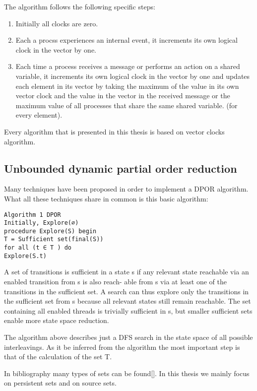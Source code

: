 \documentclass[a4paper,10pt]{article}
\begin{document}
The algorithm follows the following specific steps:

\begin{enumerate}
    \item Initially all clocks are zero.
    \item Each  a procss experiences an internal event, it increments its own logical clock in the vector by one.
    \item Each time a process receives a message or performs an action on a shared variable, it increments its own logical clock in the vector by one and updates each element in its vector 
    by taking the maximum of the value in its own vector clock and the value in the vector in the received message or the maximum value of all processes that share
    the same shared variable. (for every element).
\end{enumerate}

Every algorithm that is presented in this thesis is based on vector clocks algorithm.

\subsection{Unbounded dynamic partial order reduction}

Many techniques have been proposed in order to implement a DPOR algorithm. What all these techniques share in common is this basic algorithm:

\begin{verbatim}
Algorithm 1 DPOR 
Initially, Explore(∅)
procedure Explore(S) begin
T = Sufficient set(final(S))
for all (t ∈ T ) do
Explore(S.t)
\end{verbatim}

A set of transitions is sufficient in a state s if any relevant
state reachable via an enabled transition from s is also reach-
able from s via at least one of the transitions in the sufficient
set. A search can thus explore only the transitions in the
sufficient set from s because all relevant states still remain
reachable. The set containing all enabled threads is trivially
sufficient in s, but smaller sufficient sets enable more state
space reduction.

The algorithm above describes just a DFS search in the state space of all possible interleavings.
As it be inferred from the algorithm the most important step is that of the calculation of the set T.


In bibliography many types of sets can be found[]. In this thesis we mainly focus on persistent sets and on source sets.
\end{document}
